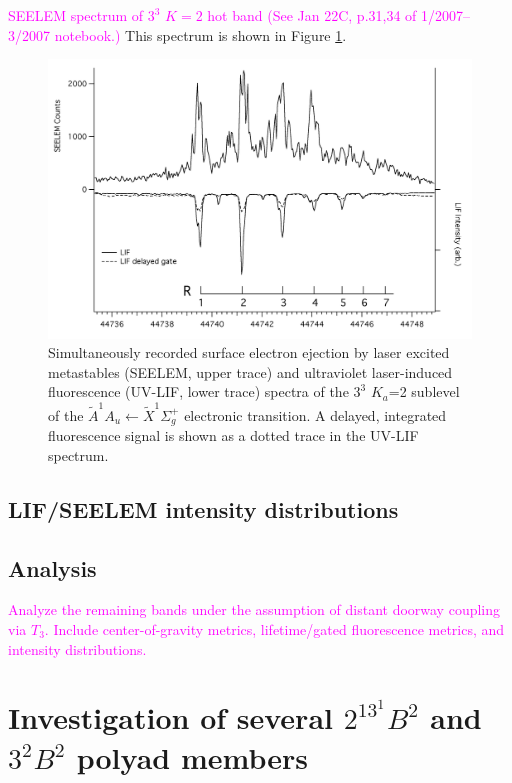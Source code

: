 \documentclass[12pt,draft]{mitthesis}
\newcommand{\POINT}[1]{\textcolor{magenta}{#1}}
\begin{document}
\POINT{SEELEM spectrum of $3^3$ $K=2$ hot band (See Jan 22C, p.31,34
  of 1/2007--3/2007 notebook.)}  This spectrum is shown in Figure
\ref{fig:spectrum-33k2}.

\begin{figure}
  \caption{
    Simultaneously recorded surface electron ejection by laser excited
    metastables (SEELEM, upper trace) and ultraviolet laser-induced
    fluorescence (UV-LIF, lower trace) spectra of the $3^3$ $K_a$=2
    sublevel of the $\tilde{A}^1A_u \leftarrow \tilde{X} ^1\Sigma_g^+$
    electronic transition. A delayed, integrated fluorescence signal
    is shown as a dotted trace in the UV-LIF spectrum.}
  \label{fig:spectrum-33k2}
  \centering
  \includegraphics[width=8in,angle=90]{spectrum-33k2.png}
\end{figure}

\subsection{LIF/SEELEM intensity distributions}

\subsection{Analysis}

\POINT{Analyze the remaining bands under the assumption of distant
  doorway coupling via $T_3$.  Include center-of-gravity metrics,
  lifetime/gated fluorescence metrics, and intensity distributions.}

\section{Investigation of several $2^13^1B^2$ and $3^2B^2$ polyad
  members}
\end{document}
